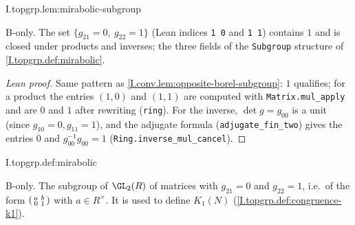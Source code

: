 \begin{lemma}
\bonly
{}
\end{lemma}
\begin{tfformal}{I.topgrp.lem:mirabolic-subgroup}
\begin{tffidelity}
B-only. The set $\{g_{21}=0,\ g_{22}=1\}$ (Lean indices \texttt{1 0} and \texttt{1 1}) contains $1$ and is closed under products and inverses; the three fields of the \texttt{Subgroup} structure of \cref{I.topgrp.def:mirabolic}.
\end{tffidelity}
\end{tfformal}
\begin{proof}[Lean proof]
Same pattern as \cref{I.conv.lem:opposite-borel-subgroup}: $1$ qualifies; for a product the entries $(1,0)$ and $(1,1)$ are computed with \texttt{Matrix.mul\_apply} and are $0$ and $1$ after rewriting (\texttt{ring}). For the inverse, $\det g=g_{00}$ is a unit (since $g_{10}=0,g_{11}=1$), and the adjugate formula (\texttt{adjugate\_fin\_two}) gives the entries $0$ and $g_{00}^{-1}g_{00}=1$ (\texttt{Ring.inverse\_mul\_cancel}).
\end{proof}

\begin{definition}
\bonly
{}
\end{definition}
\begin{tfformal}{I.topgrp.def:mirabolic}
\begin{tffidelity}
B-only. The subgroup of $\GL_2(R)$ of matrices with $g_{21}=0$ and $g_{22}=1$, i.e.\ of the form $\begin{psmallmatrix}a&b\\0&1\end{psmallmatrix}$ with $a\in R^\times$. It is used to define $K_1(N)$ (\cref{I.topgrp.def:congruence-k1}).
\end{tffidelity}
\end{tfformal}

